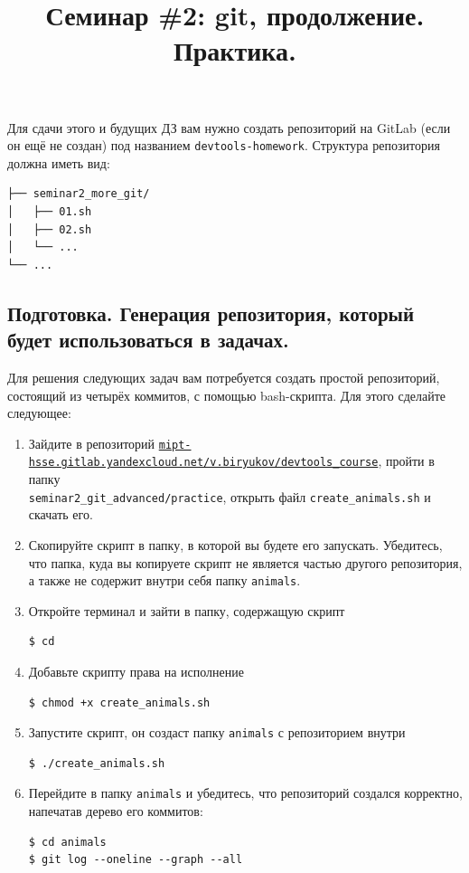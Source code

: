 \documentclass{article}
\begin{document}
\title{Семинар \#2: git, продолжение. Практика. \vspace{-5ex}}\date{}\maketitle
Для сдачи этого и будущих ДЗ вам нужно создать репозиторий на GitLab (если он ещё не создан) под названием \texttt{devtools-homework}. Структура репозитория должна иметь вид:
\begin{center}
\begin{BVerbatim}
├── seminar2_more_git/
│   ├── 01.sh
│   ├── 02.sh
│   └── ...
└── ...
\end{BVerbatim}
\end{center}



\subsection*{Подготовка. Генерация репозитория, который будет использоваться в задачах.}
Для решения следующих задач вам потребуется создать простой репозиторий, состоящий из четырёх коммитов, с помощью bash-скрипта. Для этого сделайте следующее:
\begin{enumerate}
\item Зайдите в репозиторий \href{https://mipt-hsse.gitlab.yandexcloud.net/v.biryukov/devtools_course}{\texttt{mipt-hsse.gitlab.yandexcloud.net/v.biryukov/devtools\_course}}, пройти в папку\\ 
\texttt{seminar2\_git\_advanced/practice}, открыть файл \texttt{create\_animals.sh} и скачать его.

\item Скопируйте скрипт в папку, в которой вы будете его запускать. Убедитесь, что папка, куда вы копируете скрипт не является частью другого репозитория, а также не содержит внутри себя папку \texttt{animals}.

\item Откройте терминал и зайти в папку, содержащую скрипт
\begin{lstlisting}
$ cd 
\end{lstlisting}

\item Добавьте скрипту права на исполнение
\begin{lstlisting}[style=csMiptBash]
$ chmod +x create_animals.sh
\end{lstlisting}

\item Запустите скрипт, он создаст папку \texttt{animals} с репозиторием внутри
\begin{lstlisting}[style=csMiptBash]
$ ./create_animals.sh
\end{lstlisting}

\item Перейдите в папку \texttt{animals} и убедитесь, что репозиторий создался корректно, напечатав дерево его коммитов:
\begin{lstlisting}[style=csMiptBash]
$ cd animals
$ git log --oneline --graph --all
\end{lstlisting}
\end{enumerate}
\end{document}
